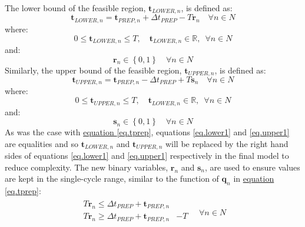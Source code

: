 The lower bound of the feasible region, $\boldsymbol{t}_{\mathit{LOWER},n}$, is
defined as:
\begin{equation}
    \boldsymbol{t}_{\mathit{LOWER},n} = \boldsymbol{t}_{\mathit{PREP},n} +
    \Delta t_{\mathit{PREP}} - T \boldsymbol{r}_{n} \quad \forall n \in N
    \label{eq.lower1}
\end{equation}
where:
\begin{equation}
    0 \le \boldsymbol{t}_{\mathit{LOWER},n} \le T, \quad 
    \boldsymbol{t}_{\mathit{LOWER},n} \in \mathbb{R}, \enspace \forall n \in N
    \label{eq.lower2}
\end{equation}
and:
\begin{equation}
    \boldsymbol{r}_{n} \in \left\{ 0, 1 \right\} \quad \forall n \in N
    \label{eq.r}
\end{equation}
Similarly, the upper bound of the feasible region, 
$\boldsymbol{t}_{\mathit{UPPER},n}$, is defined as:
\begin{equation}
    \boldsymbol{t}_{\mathit{UPPER},n} = \boldsymbol{t}_{\mathit{PREP},n} -
    \Delta t_{\mathit{PREP}} + T \boldsymbol{s}_{n} \quad \forall n \in N
    \label{eq.upper1}
\end{equation}
where:
\begin{equation}
    0 \le \boldsymbol{t}_{\mathit{UPPER},n} \le T, \quad
    \boldsymbol{t}_{\mathit{LOWER},n} \in \mathbb{R}, \enspace \forall n \in N
    \label{eq.upper2}
\end{equation}
and:
\begin{equation}
    \boldsymbol{s}_{n} \in \left\{ 0, 1 \right\} \quad \forall n \in N
    \label{eq.s}
\end{equation} 
As was the case with \hyperref[eq.tprep]{equation \ref*{eq.tprep}},
equations \ref{eq.lower1} and \ref{eq.upper1} are equalities and so 
$\boldsymbol{t}_{\mathit{LOWER},n}$ and $\boldsymbol{t}_{\mathit{UPPER},n}$
will be replaced by the right hand sides of equations \ref{eq.lower1} and
\ref{eq.upper1} respectively in the final model to reduce complexity.
The new binary variables, $\boldsymbol{r}_{n}$ and $\boldsymbol{s}_{n}$, are
used to ensure values are kept in the single-cycle range, similar to the
function of $\boldsymbol{q}_{n}$ in
\hyperref[eq.tprep]{equation \ref*{eq.tprep}}:
\begin{equation}
    \begin{split}
        \begin{alignedat}{2}
            T \boldsymbol{r}_{n} \le \Delta t_{\mathit{PREP}}
            + \boldsymbol{t}_{\mathit{PREP},n}&\\
            T \boldsymbol{r}_{n} \ge \Delta t_{\mathit{PREP}}
            + \boldsymbol{t}_{\mathit{PREP},n}& - T\\
            \end{alignedat}
        \quad \forall n \in N
    \end{split}
    \label{eq.r1}
\end{equation}
